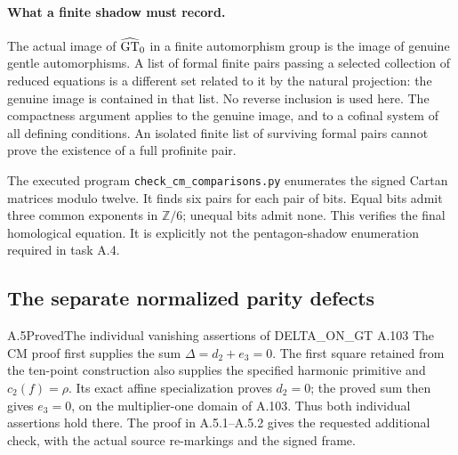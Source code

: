 \paragraph{What a finite shadow must record.}
The actual image of $\widehat{\mathrm{GT}}_0$ in a finite automorphism group is the image of genuine gentle automorphisms. A list of formal finite pairs passing a selected collection of reduced equations is a different set related to it by the natural projection: the genuine image is contained in that list. No reverse inclusion is used here. The compactness argument applies to the genuine image, and to a cofinal system of all defining conditions. An isolated finite list of surviving formal pairs cannot prove the existence of a full profinite pair.

The executed program \texttt{check\_cm\_comparisons.py} enumerates the signed Cartan matrices modulo twelve. It finds six pairs for each pair of bits. Equal bits admit three common exponents in $\mathbb Z/6$; unequal bits admit none. This verifies the final homological equation. It is explicitly not the pentagon-shadow enumeration required in task A.4.

\subsection{The separate normalized parity defects}
\begin{result}{A.5}{Proved}{The individual vanishing assertions of DELTA\_ON\_GT A.103}
The CM proof first supplies the sum $\Delta=d_2+e_3=0$.
The first square retained from the ten-point construction also
supplies the specified harmonic primitive and $c_2(f)=\rho$.
Its exact affine specialization proves $d_2=0$; the proved
sum then gives $e_3=0$, on the multiplier-one domain of
A.103. Thus both individual assertions hold there. The
proof in A.5.1--A.5.2 gives the requested additional check,
with the actual source re-markings and the signed frame.
\end{result}

